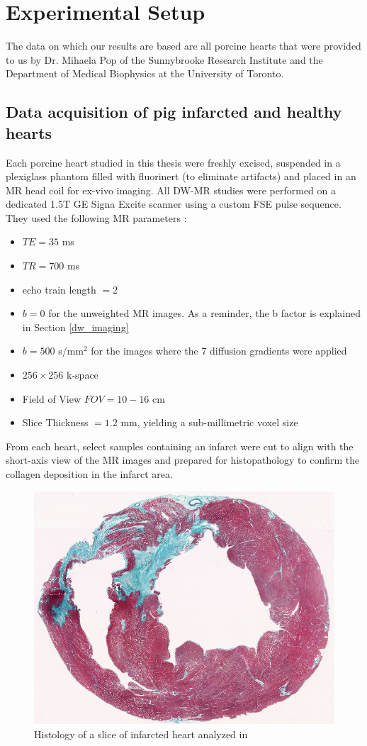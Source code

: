 \section{Experimental Setup}

The data on which our results are based are all porcine hearts that were provided to us by Dr. Mihaela Pop of the Sunnybrooke Research Institute and the Department of Medical Biophysics at the University of Toronto.

\subsection{Data acquisition of pig infarcted and healthy hearts}

Each porcine heart studied in this thesis were freshly excised, suspended in a plexiglass phantom filled with fluorinert (to eliminate artifacts) and placed in an MR head coil for ex-vivo imaging. All DW-MR studies were performed on a dedicated 1.5T GE Signa Excite scanner using a custom FSE pulse sequence. They used the following MR parameters \cite{pmbpop2013quantification}: 
\begin{itemize}
    \item $TE = 35$ ms
    \item $TR = 700$ ms
    \item echo train length $=2$
    \item $b = 0$ for the unweighted MR images. As a reminder, the b factor is explained in Section \ref{dw_imaging}
    \item $b = 500 $ s/$\text{mm}^2$ for the images where the 7 diffusion gradients were applied
    \item $256 \times 256$ k-space
    \item Field of View $FOV = 10-16$ cm
    \item Slice Thickness $ = 1.2$ mm, yielding a sub-millimetric voxel size
\end{itemize}
From each heart, select samples containing an infarct were cut to align with the short-axis view of the MR images and prepared for histopathology to confirm the collagen deposition in the infarct area.

\begin{figure}[t!]
    \centering
    \includegraphics[width=.78\textwidth]{figures/Gip4_histology}
    \caption{Histology of a slice of infarcted heart analyzed in \cite{pmbpop2013quantification}}
    \label{fig:histology_pig_4}
\end{figure}

